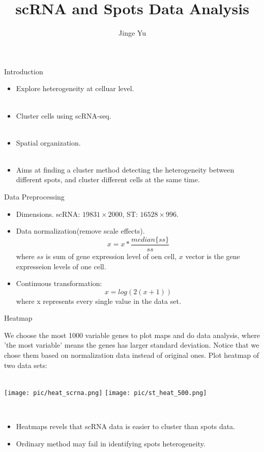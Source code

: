\documentclass[10 pt]{beamer}
\title[]{scRNA and Spots Data Analysis}
\author[Jinge Yu]{Jinge Yu \\[2mm]}
\institute[]{Institute of Statistics \\ Renmin University of China\\[4mm]
	
}
\date{}
\begin{document}
	
	\begin{frame}
	\titlepage
\end{frame}


\begin{frame}{Introduction}

\begin{itemize}
	\item Explore heterogeneity at celluar level.
	~\\
	~\\
	\item Cluster cells using scRNA-seq.
	~\\
	~\\
	\item Spatial organization.
	~\\
	~\\
	\item Aims at finding a cluster method detecting the heterogeneity between different spots, and cluster different cells at the same time.
\end{itemize}
\end{frame}

\begin{frame}{Data Preprocessing}
\begin{itemize}
	\item Dimensions. scRNA: $19831 \times 2000$, ST: $16528\times 996$.
	\item Data normalization(remove scale effects).
              $$  x =  x * \frac{median\{ss\}}{ss}$$
              	where $ss$ is sum of gene expression level of oen cell,  $x$ vector is the gene expresseion levels of one cell. 
	\item Continuous transformation:
           	$$x = log(2(x+1))$$
           	where x represents every single value in the data set.
	\end{itemize}
\end{frame}


\begin{frame}{Heatmap}

	We choose the most 1000 variable genes to plot maps and do data analysis, where 'the most variable' means the genes has larger  standard deviation. Notice that we chose them based on normalization data instead of original ones. Plot heatmap of two data sets:
	~\\
	~\\
	\centerline{\texttt{[image: pic/heat\_scrna.png]}
		\texttt{[image: pic/st\_heat\_500.png]}}
	~\\
	\begin{itemize}
	\item Heatmaps revels that scRNA data is easier to cluster than spots data.
	\item Ordinary method may fail in identifying spots heterogeneity.
	\end{itemize}
\end{frame}
\end{document}
